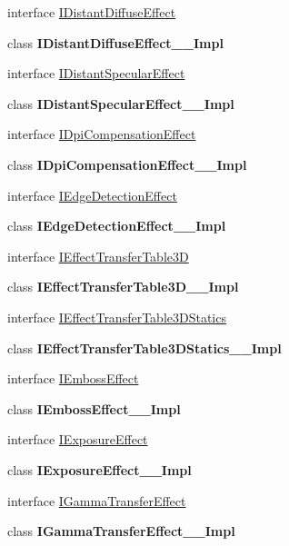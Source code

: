 \begin{DoxyCompactItemize}
\item 
interface \hyperlink{interface_microsoft_1_1_graphics_1_1_canvas_1_1_effects_1_1_i_distant_diffuse_effect}{I\+Distant\+Diffuse\+Effect}
\item 
class {\bfseries I\+Distant\+Diffuse\+Effect\+\_\+\+\_\+\+Impl}
\item 
interface \hyperlink{interface_microsoft_1_1_graphics_1_1_canvas_1_1_effects_1_1_i_distant_specular_effect}{I\+Distant\+Specular\+Effect}
\item 
class {\bfseries I\+Distant\+Specular\+Effect\+\_\+\+\_\+\+Impl}
\item 
interface \hyperlink{interface_microsoft_1_1_graphics_1_1_canvas_1_1_effects_1_1_i_dpi_compensation_effect}{I\+Dpi\+Compensation\+Effect}
\item 
class {\bfseries I\+Dpi\+Compensation\+Effect\+\_\+\+\_\+\+Impl}
\item 
interface \hyperlink{interface_microsoft_1_1_graphics_1_1_canvas_1_1_effects_1_1_i_edge_detection_effect}{I\+Edge\+Detection\+Effect}
\item 
class {\bfseries I\+Edge\+Detection\+Effect\+\_\+\+\_\+\+Impl}
\item 
interface \hyperlink{interface_microsoft_1_1_graphics_1_1_canvas_1_1_effects_1_1_i_effect_transfer_table3_d}{I\+Effect\+Transfer\+Table3D}
\item 
class {\bfseries I\+Effect\+Transfer\+Table3\+D\+\_\+\+\_\+\+Impl}
\item 
interface \hyperlink{interface_microsoft_1_1_graphics_1_1_canvas_1_1_effects_1_1_i_effect_transfer_table3_d_statics}{I\+Effect\+Transfer\+Table3\+D\+Statics}
\item 
class {\bfseries I\+Effect\+Transfer\+Table3\+D\+Statics\+\_\+\+\_\+\+Impl}
\item 
interface \hyperlink{interface_microsoft_1_1_graphics_1_1_canvas_1_1_effects_1_1_i_emboss_effect}{I\+Emboss\+Effect}
\item 
class {\bfseries I\+Emboss\+Effect\+\_\+\+\_\+\+Impl}
\item 
interface \hyperlink{interface_microsoft_1_1_graphics_1_1_canvas_1_1_effects_1_1_i_exposure_effect}{I\+Exposure\+Effect}
\item 
class {\bfseries I\+Exposure\+Effect\+\_\+\+\_\+\+Impl}
\item 
interface \hyperlink{interface_microsoft_1_1_graphics_1_1_canvas_1_1_effects_1_1_i_gamma_transfer_effect}{I\+Gamma\+Transfer\+Effect}
\item 
class {\bfseries I\+Gamma\+Transfer\+Effect\+\_\+\+\_\+\+Impl}

\end{DoxyCompactItemize}
